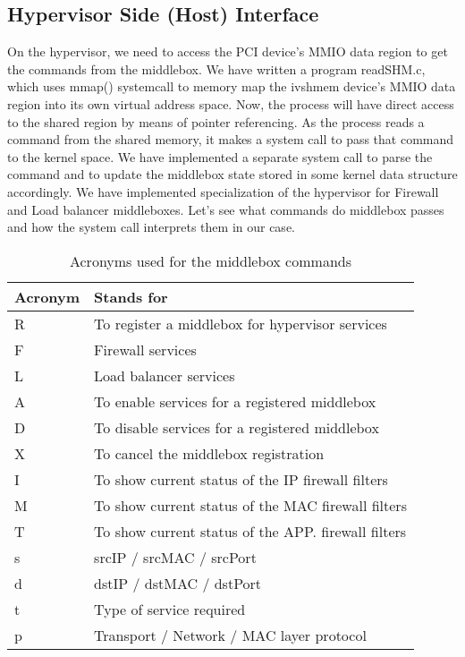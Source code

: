 \documentclass[a4paper,11pt]{report}
\begin{document}
\subsection{Hypervisor Side (Host) Interface}
On the hypervisor, we need to access the PCI device's MMIO data region to get the commands from the middlebox. We have written a program readSHM.c, which uses mmap() systemcall to memory map the ivshmem device's MMIO data region into its own virtual address space. Now, the process will have direct access to the shared region by means of pointer referencing. As the process reads a command from the shared memory, it makes a system call to pass that command to the kernel space. We have implemented a separate system call to parse the command and to update the middlebox state stored in some kernel data structure accordingly. We have implemented specialization of the hypervisor for Firewall and Load balancer middleboxes. Let's see what commands do middlebox passes and how the system call interprets them in our case.   
\begin{table}[H]
\centering
\begin{tabular}{ | C{4.3cm} | L{10cm} | }
\hline
{\textbf {Acronym}} & {\textbf {Stands for}}\\ %
\hline
\hline
{R} & {To register a middlebox for hypervisor services} \\ %
\hline
{F} & {Firewall services} \\
\hline
{L} & {Load balancer services} \\
\hline
{A} & {To enable services for a registered middlebox} \\
\hline
{D} & {To disable services for a registered middlebox} \\
\hline
{X} & {To cancel the middlebox registration} \\
\hline
{I} & {To show current status of the IP firewall filters} \\
\hline
{M} & {To show current status of the MAC firewall filters} \\
\hline
{T} & {To show current status of the APP. firewall filters} \\
\hline
{s} & {srcIP / srcMAC / srcPort} \\
\hline
{d} & {dstIP / dstMAC / dstPort} \\
\hline
{t} & {Type of service required} \\
\hline
{p} & {Transport / Network / MAC layer protocol} \\
\hline
\end{tabular}
\caption{Acronyms used for the middlebox commands}
\end{table}     
\end{document}
